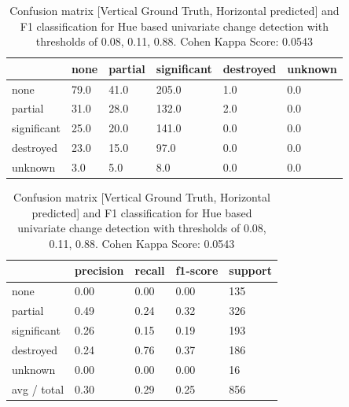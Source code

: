 \begin{table} [H]
	\footnotesize
	\captionsetup{justification=raggedright,singlelinecheck=false}
	\caption{Confusion matrix [Vertical Ground Truth, Horizontal predicted] and F1 classification for Hue based univariate change detection with thresholds of 0.08, 0.11, 0.88. Cohen Kappa Score: 0.0543}
	\begin{tabular}{l|lllll}
            & none & partial & significant & destroyed & unknown \\\hline
none        & 79.0 & 41.0    & 205.0       & 1.0       & 0.0     \\
partial     & 31.0 & 28.0    & 132.0       & 2.0       & 0.0     \\
significant & 25.0 & 20.0    & 141.0       & 0.0       & 0.0     \\
destroyed   & 23.0 & 15.0    & 97.0        & 0.0       & 0.0     \\
unknown     & 3.0  & 5.0     & 8.0         & 0.0       & 0.0    
	\end{tabular}
	\begin{tabular}{l|llll}
		& precision & recall & f1-score & support \\ \hline
none        & 0.00 & 0.00 & 0.00 & 135 \\
partial     & 0.49 & 0.24 & 0.32 & 326 \\
significant & 0.26 & 0.15 & 0.19 & 193 \\
destroyed   & 0.24 & 0.76 & 0.37 & 186 \\
unknown     & 0.00 & 0.00 & 0.00 & 16  \\
avg / total & 0.30 & 0.29 & 0.25 & 856\\
	\end{tabular}
	\label{tab:matH2}
\end{table}


